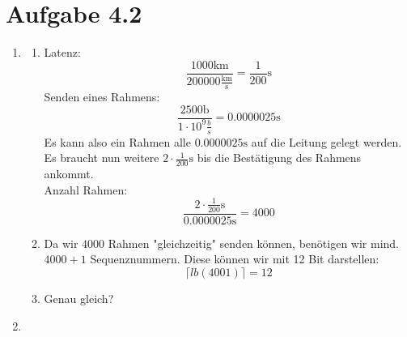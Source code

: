 \documentclass[12pt, a4paper]{article}
\begin{document}
\section*{Aufgabe 4.2}
\begin{enumerate}[label=\alph*)]
	\item	\begin{enumerate}[label=\roman*)]
				\item	Latenz: $$\frac{1000 \text{km}}{200000 \frac{\text{km}}{\text{s}}} = \frac{1}{200} \text{s}$$
						Senden eines Rahmens: $$\frac{2500 \text{b}}{1 \cdot 10^9 \frac{b}{s}} = 0.0000025 \text{s}$$
						Es kann also ein Rahmen alle $0.0000025 \text{s}$ auf die Leitung gelegt werden. Es braucht nun weitere $2 \cdot \frac{1}{200} \text{s}$ bis die Bestätigung des Rahmens ankommt.\\
						Anzahl Rahmen: $$\frac{2 \cdot \frac{1}{200} \text{s}}{0.0000025 \text{s}} = 4000$$
				\item	Da wir $4000$ Rahmen "gleichzeitig" senden können, benötigen wir mind. $4000 + 1$ Sequenznummern. Diese können wir mit 12 Bit darstellen: $$\lceil lb(4001) \rceil = 12$$
				\item	Genau gleich?
			\end{enumerate}
	\item	
\end{enumerate}


\newpage
\end{document}
